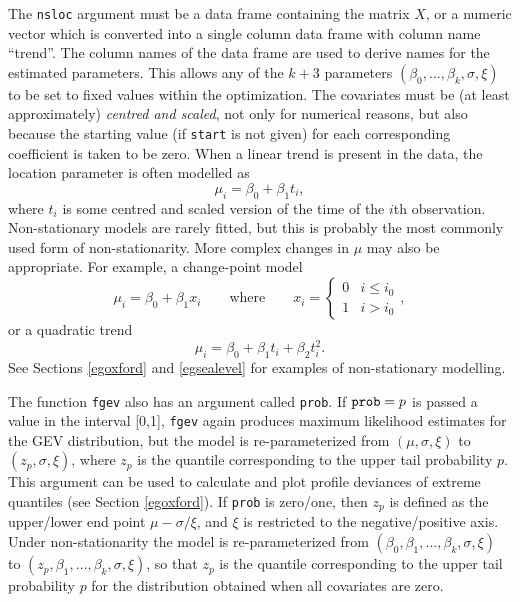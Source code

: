\documentclass[11pt,a4paper]{article}
\begin{document}
The \verb+nsloc+ argument must be a data frame containing the matrix $X$, or a numeric vector which is converted into a single column data frame with column name ``trend''.
The column names of the data frame are used to derive names for the estimated parameters.
This allows any of the $k+3$ parameters $(\beta_0,\dots,\beta_k,\sigma,\xi)$ to be set to fixed values within the optimization.  
The covariates must be (at least approximately) \emph{centred and scaled}, not only for numerical reasons, but also because the starting value (if \verb+start+ is not given) for each corresponding coefficient is taken to be zero.
When a linear trend is present in the data, the location parameter is often modelled as 
\begin{equation*}
\mu_i = \beta_0 + \beta_1t_i,
\end{equation*}
where $t_i$ is some centred and scaled version of the time of the $i$th observation.
Non-stationary models are rarely fitted, but this is probably the most commonly used form of non-stationarity.
More complex changes in $\mu$ may also be appropriate.
For example, a change-point model   
\begin{equation*}
\mu_i = \beta_0 + \beta_1x_i \qquad \text{where} \qquad
x_i = 
\begin{cases}
0 & i \leq i_0 \\
1 & i > i_0
\end{cases},
\end{equation*}
or a quadratic trend
\begin{equation*}
\mu_i = \beta_0 + \beta_1t_i + \beta_2t_i^2.
\end{equation*}
See Sections \ref{egoxford} and \ref{egsealevel} for examples of non-stationary modelling. 

The function \verb+fgev+ also has an argument called \verb+prob+.
If $\verb+prob+ = p$ is passed a value in the interval [0,1], \verb+fgev+ again produces maximum likelihood estimates for the GEV distribution, but the model is re-parameterized from $(\mu,\sigma,\xi)$ to $(z_p,\sigma,\xi)$, where $z_p$ is the quantile corresponding to the upper tail probability $p$. This argument can be used to calculate and plot profile deviances of extreme quantiles (see Section \ref{egoxford}).
If \verb+prob+ is zero/one, then $z_p$ is defined as the upper/lower end point $\mu - \sigma/\xi$, and $\xi$ is restricted to the negative/positive axis.
Under non-stationarity the model is re-parameterized from $(\beta_0,\beta_1,\dots,\beta_k,\sigma,\xi)$ to $(z_p,\beta_1,\dots,\beta_k,\sigma,\xi)$, so that $z_p$ is the quantile corresponding to the upper tail probability $p$ for the distribution obtained when all covariates are zero.
\end{document}

